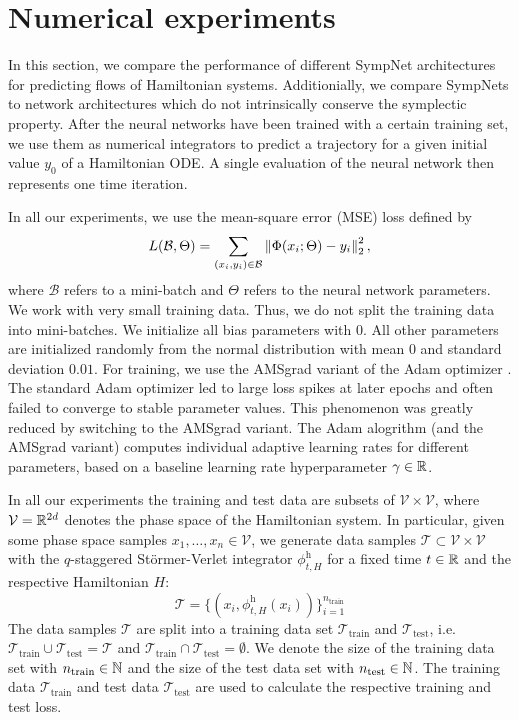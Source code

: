 \documentclass[twoside,a4paper]{article}
\begin{document}
\section{Numerical experiments}\label{sec_numerical_experiments}

In this section, we compare the performance of different SympNet architectures 
for predicting flows of Hamiltonian systems.
Additionially, we compare SympNets to network architectures which do not intrinsically
conserve the symplectic property.
After the neural networks have been trained with a certain training set,
we use them as numerical integrators
to predict a trajectory for a given initial value $y_0$ of a Hamiltonian ODE.
A single evaluation of the neural network then represents one time iteration.

In all our experiments, we use the mean-square error (MSE) loss defined by
\begin{equation*}
	L(\mathcal{B}, \Theta) = \sum_{(x_i, y_i) \in \mathcal{B}} \left\lVert{\Phi(x_i; \Theta) - y_i}\right\rVert^2_2
	,
\end{equation*}
where $\mathcal{B}$ refers to a mini-batch and $\Theta$ refers to the neural network parameters.
We work with very small training data. Thus, we do not split the training data into mini-batches.
We initialize all bias parameters with $0$. All other parameters are initialized randomly from
the normal distribution with mean $0$ and standard deviation $0.01$.
For training, we use the AMSgrad variant of the Adam optimizer \cite{amsgrad2018}.
The standard Adam optimizer led to large loss spikes at later epochs and often
failed to converge to stable parameter values. This phenomenon
was greatly reduced by switching to the AMSgrad variant. The Adam alogrithm (and the AMSgrad variant)
computes individual adaptive learning rates for different parameters, based on a baseline
learning rate hyperparameter $\gamma \in \mathbb{R}$.

In all our experiments the training and test data are subsets of $\mathcal{V} \times \mathcal{V}$,
where $\mathcal{V} = \mathbb{R}^{2d}$ denotes the phase space of the Hamiltonian system. In particular,
given some phase space samples $x_1, \dots, x_n \in \mathcal{V}$, we generate data samples 
$\mathcal{T} \subset \mathcal{V} \times \mathcal{V}$
with the $q$-staggered Störmer-Verlet integrator $\phi^{\text{h}}_{t,H}$
for a fixed time $t \in \mathbb{R}$ and the respective Hamiltonian $H$:
\begin{equation*}
	\mathcal{T} = \{ (x_i, \phi^{\text{h}}_{t,H}(x_i)) \}_{i=1}^{n_{\text{train}}}
\end{equation*}
The data samples $\mathcal{T}$ are split into a training data set $\mathcal{T}_{\text{train}}$
and $\mathcal{T}_{\text{test}}$, i.e. $\mathcal{T}_{\text{train}} \cup \mathcal{T}_{\text{test}} = \mathcal{T}$
and $\mathcal{T}_{\text{train}} \cap \mathcal{T}_{\text{test}} = \emptyset$. 
We denote the size of the training data set with $n_{\text{train}} \in \mathbb{N}$ and the size of
the test data set with $n_{\text{test}} \in \mathbb{N}$.
The training data
$\mathcal{T}_{\text{train}}$ and test data $\mathcal{T}_{\text{test}}$ are used to 
calculate the respective training and test loss.
\end{document}
